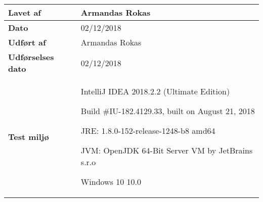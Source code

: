 \documentclass[class=article, crop=false]{standalone}
\makeatletter
\let\savespace\@minipagetrue
\makeatother
\begin{document}
\begin{table}[H]
\begin{tabularx}{\textwidth}{|l|X|}
            \textbf{Lavet af} & Armandas Rokas \\ \hline
            \textbf{Dato} & 02/12/2018 \\ \hline
            \textbf{Udført af } & Armandas Rokas \\ \hline
            \textbf{Udførselses dato}  & 02/12/2018 \\ \hline
            \textbf{Test miljø}  &  \savespace \begin{compactitem}
                                                   \item IntelliJ IDEA 2018.2.2 (Ultimate Edition)
                                                   \item Build #IU-182.4129.33, built on August 21, 2018
                                                   \item JRE: 1.8.0-152-release-1248-b8 amd64
                                                   \item JVM: OpenJDK 64-Bit Server VM by JetBrains s.r.o
                                                   \item Windows 10 10.0
            \end{compactitem} \\ \hline
        \end{tabularx}
    \end{table}
\end{document}
